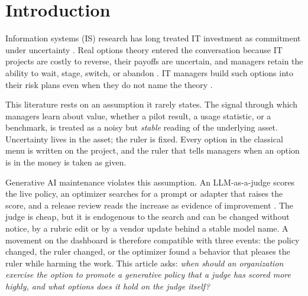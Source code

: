 \documentclass[acmsmall,screen,review,anonymous]{acmart}
\theoremstyle{acmdefinition}
\begin{document}
\section{Introduction}

Information systems (IS) research has long treated IT investment as commitment under uncertainty \citep{benaroch2002,fichman2004,taudes2000}. Real options theory entered the conversation because IT projects are costly to reverse, their payoffs are uncertain, and managers retain the ability to wait, stage, switch, or abandon \citep{dixit1994,myers1977,trigeorgis1996}. IT managers build such options into their risk plans even when they do not name the theory \citep{benaroch2006}.

This literature rests on an assumption it rarely states. The signal through which managers learn about value, whether a pilot result, a usage statistic, or a benchmark, is treated as a noisy but \emph{stable} reading of the underlying asset. Uncertainty lives in the asset; the ruler is fixed. Every option in the classical menu is written on the project, and the ruler that tells managers when an option is in the money is taken as given.

Generative AI maintenance violates this assumption. An LLM-as-a-judge scores the live policy, an optimizer searches for a prompt or adapter that raises the score, and a release review reads the increase as evidence of improvement \citep{zheng2023}. The judge is cheap, but it is endogenous to the search and can be changed without notice, by a rubric edit or by a vendor update behind a stable model name. A movement on the dashboard is therefore compatible with three events: the policy changed, the ruler changed, or the optimizer found a behavior that pleases the ruler while harming the work. This article asks: \emph{when should an organization exercise the option to promote a generative policy that a judge has scored more highly, and what options does it hold on the judge itself?}
\end{document}
